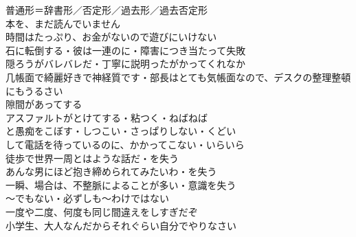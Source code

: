 普通形＝辞書形／否定形／過去形／過去否定形\\
本を、まだ読んでいません\\
時間はたっぷり、お金がないので遊びにいけない\\

石に転倒する・彼は一連のに・障害につき当たって失敗\\
隠ろうがバレバレだ・丁寧に説明ったがかってくれなか\\
几帳面で綺麗好きで神経質です・部長はとても気帳面なので、デスクの整理整頓にもうるさい\\

隙間があってする\\
アスファルトがとけてする・粘つく・ねばねば\\
と愚痴をこぼす・しつこい・さっぱりしない・くどい\\
して電話を待っているのに、かかってこない・いらいら\\

徒歩で世界一周とはような話だ・を失う\\
あんな男にほど抱き締められてみたいわ・を失う\\
一瞬、場合は、不整脈によることが多い・意識を失う\\

〜でもない・必ずしも～わけではない\\
一度や二度、何度も同じ間違えをしすぎだぞ\\
小学生、大人なんだからそれぐらい自分でやりなさい\\
